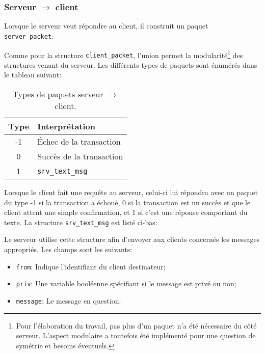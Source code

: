 \documentclass[12pt,french]{article}
\begin{document}
            \subsubsection{Serveur $\rightarrow$ client} %
            \label{ssub:serveur-client}
                Lorsque le serveur veut répondre au client, il construit un paquet {\tt
                server\_packet}:
                
                Comme pour la structure {\tt client\_packet}, l'union permet la
                modularité\footnote{Pour l'élaboration du travail, pas plus d'un paquet n'a été
                nécessaire du côté serveur. L'aspect modulaire a toutefois été implémenté pour une
                question de symétrie et besoins éventuels.} des structures venant du serveur. Les
                différents types de paquets sont énumérés dans le tableau suivant:
                \begin{table}[H]
                    \centering
                    \begin{tabular}{|c|l|}
                        \hline {\bf Type}&{\bf Interprétation}\\
                        \hline -1& Échec de la transaction\\
                        \hline 0&Succès de la transaction\\
                        \hline 1&{\tt srv\_text\_msg}\\
                        \hline
                    \end{tabular}
                    \caption{Types de paquets serveur $\rightarrow$ client.}
                \end{table}
                Lorsque le client fait une requête au serveur, celui-ci lui répondra avec un paquet
                du type -1 si la transaction a échoué, 0 si la transaction est un succès et que le
                client attent une simple confirmation, et 1 si c'est une réponse comportant du
                texte. La structure {\tt srv\_text\_msg} est listé ci-bas:
                
                Le serveur utilise cette structure afin d'envoyer aux clients concernés les messages
                appropriés. Les champs sont les suivants:
                \begin{itemize}
                    \item {\tt from}: Indique l'identifiant du client destinateur;
                    \item {\tt priv}: Une variable booléenne spécifiant si le message est privé ou
                        non;
                    \item {\tt message}: Le message en question.
                \end{itemize}
                
\end{document}

